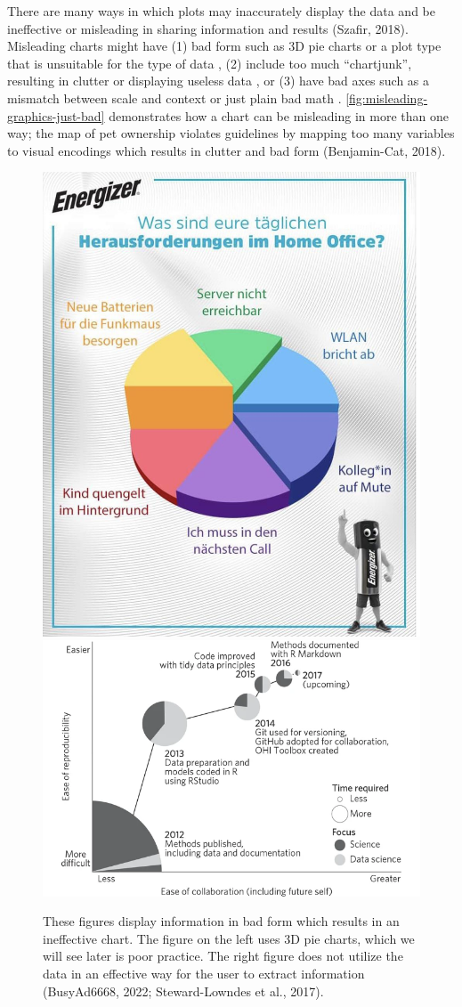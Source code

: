 \documentclass[print]{nuthesis}
\begin{document}
There are many ways in which plots may inaccurately display the data and be ineffective or misleading in sharing information and results (Szafir, 2018).
Misleading charts might have (1) bad form such as 3D pie charts or a plot type that is unsuitable for the type of data , (2) include too much ``chartjunk'', resulting in clutter or displaying useless data , or (3) have bad axes such as a mismatch between scale and context or just plain bad math .
\cref{fig:misleading-graphics-just-bad} demonstrates how a chart can be misleading in more than one way; the map of pet ownership violates guidelines by mapping too many variables to visual encodings which results in clutter and bad form (Benjamin-Cat, 2018).

\begin{figure}[tbp]

{\centering \includegraphics[width=0.49\linewidth,]{images/misleading-graphics-3d-pie-batteries} \includegraphics[width=0.49\linewidth,]{images/misleading-graphics-bad-form-better-science} 

}

\caption[Misleading graphical form examples]{These figures display information in bad form which results in an ineffective chart. The figure on the left uses 3D pie charts, which we will see later is poor practice. The right figure does not utilize the data in an effective way for the user to extract information (BusyAd6668, 2022; Steward-Lowndes et al., 2017).}\label{fig:misleading-graphics-form}
\end{figure}
\end{document}
